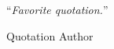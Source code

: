 
\vspace*{0.2\textheight}

\noindent\enquote{\itshape Favorite quotation.}\bigbreak

\hfill Quotation Author
